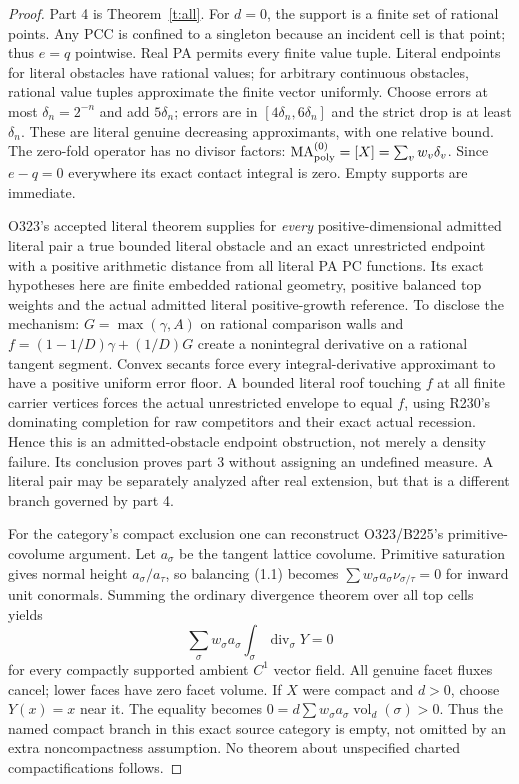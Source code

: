 \documentclass[11pt]{article}
\newcommand{\MA}{\operatorname{MA}_{\rm poly}}\newcommand{\rec}{\operatorname{rec}}
\begin{document}
\begin{proof}
Part 4 is Theorem~\ref{t:all}. For $d=0$, the support is a finite set of rational points. Any PCC is confined to a singleton because an incident cell is that point; thus $e=q$ pointwise. Real PA permits every finite value tuple. Literal endpoints for literal obstacles have rational values; for arbitrary continuous obstacles, rational value tuples approximate the finite vector uniformly. Choose errors at most $\delta_n=2^{-n}$ and add $5\delta_n$; errors are in $[4\delta_n,6\delta_n]$ and the strict drop is at least $\delta_n$. These are literal genuine decreasing approximants, with one relative bound. The zero-fold operator has no divisor factors: $\MA^{(0)}=[X]=\sum_v w_v\delta_v$. Since $e-q=0$ everywhere its exact contact integral is zero. Empty supports are immediate.

O323's accepted literal theorem supplies for \emph{every} positive-dimensional admitted literal pair a true bounded literal obstacle and an exact unrestricted endpoint with a positive arithmetic distance from all literal PA PC functions. Its exact hypotheses here are finite embedded rational geometry, positive balanced top weights and the actual admitted literal positive-growth reference. To disclose the mechanism: $G=\max(\gamma,A)$ on rational comparison walls and $f=(1-1/D)\gamma+(1/D)G$ create a nonintegral derivative on a rational tangent segment. Convex secants force every integral-derivative approximant to have a positive uniform error floor. A bounded literal roof touching $f$ at all finite carrier vertices forces the actual unrestricted envelope to equal $f$, using R230's dominating completion for raw competitors and their exact actual recession. Hence this is an admitted-obstacle endpoint obstruction, not merely a density failure. Its conclusion proves part 3 without assigning an undefined measure. A literal pair may be separately analyzed after real extension, but that is a different branch governed by part 4.

For the category's compact exclusion one can reconstruct O323/B225's primitive-covolume argument. Let $a_\sigma$ be the tangent lattice covolume. Primitive saturation gives normal height $a_\sigma/a_\tau$, so balancing (1.1) becomes $\sum w_\sigma a_\sigma\nu_{\sigma/\tau}=0$ for inward unit conormals. Summing the ordinary divergence theorem over all top cells yields
\[
 \sum_\sigma w_\sigma a_\sigma\int_\sigma\operatorname{div}_\sigma Y=0
\]
for every compactly supported ambient $C^1$ vector field. All genuine facet fluxes cancel; lower faces have zero facet volume. If $X$ were compact and $d>0$, choose $Y(x)=x$ near it. The equality becomes $0=d\sum w_\sigma a_\sigma\operatorname{vol}_d(\sigma)>0$. Thus the named compact branch in this exact source category is empty, not omitted by an extra noncompactness assumption. No theorem about unspecified charted compactifications follows.
\end{proof}
\end{document}
